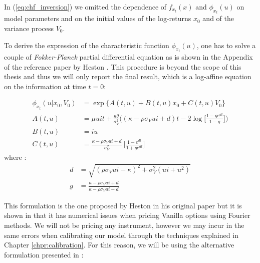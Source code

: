 In (\ref{eq:chf_inversion}) we omitted the dependence of $f_{x_t}(x)$ and $\phi_{x_t}(u)$ on model parameters and on the initial values of the log-returns $x_0$ and of the variance process $V_0$. 

\bigskip

To derive the expression of the characteristic function $\phi_{x_t}(u)$, one has to solve a couple of \textit{Fokker-Planck} partial differential equation as is shown in the Appendix of the reference paper by Heston \citep{HESTON93}. This procedure is beyond the scope of this thesis and thus we will only report the final result, which is a log-affine equation on the information at time $t = 0$:

\begin{subequations}
\begin{align}
\label{eq:heston_chf+ABC}
	\phi_{x_t}(u| x_0, V_0) &= \exp\{A(t,u) + B(t,u) x_0 + C(t,u) V_0\}\nonumber \\
	A(t,u) &= \mu u i t +  \frac{\kappa\theta}{\sigma_V^2} \bigg( (\kappa - \rho\sigma_V u i +d)t - 2 \log\Big[  \frac{1-ge^{dt}}{1-g} \Big] \bigg)\\
	B(t,u) &= i u \\
	C(t,u)&= \frac{\kappa - \rho\sigma_V u i +d}{\sigma_V^2} \:\Big[\frac{1-e^{dt}}{1+ge^{dt}}\Big]
\end{align}
\end{subequations} 
where :
\begin{equation*}
\begin{split}
d&=\sqrt{(\rho \sigma_V u i - \kappa)^2 + \sigma_V^2(u i + u^2)}\\
g&= \frac{\kappa - \rho\sigma_V u i + d}{\kappa - \rho\sigma_V u i - d}
\end{split}
\end{equation*} 



This formulation is the one proposed by Heston in his original paper \citep{HESTON93} but it is shown in \citep{HESTONTRAP}  that it has numerical issues when  pricing Vanilla options using Fourier methods. We will not be pricing any instrument, however we may incur in the same errors when calibrating our model through the techniques explained in Chapter \ref{chpr:calibration}. For this reason, we will be using the alternative formulation presented in \citep{HESTONTRAP}:




